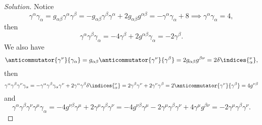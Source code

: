 \begin{proof}[Solution]
   Notice
   \begin{equation*}
      \gamma^\alpha\gamma_\alpha = g_{\alpha \beta} \gamma^\alpha \gamma^\beta = - g_{\alpha \beta} \gamma^{\beta}\gamma^{\alpha} + 2g_{\alpha \beta}g^{\alpha \beta} = - \gamma^\alpha \gamma_\alpha + 8 \implies \gamma^\alpha \gamma_\alpha = 4,
   \end{equation*}
   then
   \begin{equation*}
      \gamma^\alpha \gamma^\beta \gamma_\alpha = - 4\gamma^\beta + 2g^{\alpha \beta} \gamma_{\alpha} = -2 \gamma^\beta.
   \end{equation*}
   We also have
   \begin{equation*}
      \anticommutator{\gamma^\nu}{\gamma_{\alpha}} = g_{\alpha \beta}\anticommutator{\gamma^\nu}{\gamma^\beta} = 2g_{\alpha \beta} g^{\beta \nu} = 2 \delta\indices{^\nu_\alpha},
   \end{equation*}
   then
   \begin{equation*}
      \gamma^\alpha \gamma^\beta \gamma^\nu \gamma_{\alpha} = - \gamma^\alpha \gamma^\beta \gamma_{\alpha} \gamma^\nu + 2 \gamma^\alpha \gamma^\beta \delta\indices{^\nu_\alpha} = 2 \gamma^\beta \gamma^\nu + 2 \gamma^{\nu}\gamma^\beta = 2 \anticommutator{\gamma^\nu}{\gamma^\beta} = 4 g^{\nu \beta}
   \end{equation*}
   and
   \begin{equation*}
      \gamma^\alpha \gamma^\beta \gamma^\nu \gamma^\mu \gamma_{\alpha} = - 4g^{\nu \beta} \gamma^\mu + 2 \gamma^\mu \gamma^\beta \gamma^\nu = -4 g^{\nu \beta} \gamma^\mu - 2 \gamma^\mu \gamma^\beta \gamma^\nu + 4 \gamma^\mu g^{\beta\nu} = -2 \gamma^\mu \gamma^\beta \gamma^\nu.
   \end{equation*}


\end{proof}
